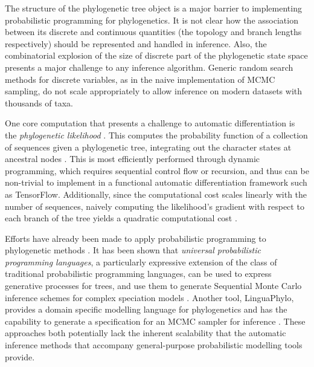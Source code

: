 The structure of the phylogenetic tree object is a major barrier to implementing probabilistic programming for phylogenetics. It is not clear how the association between its discrete and continuous quantities (the topology and branch lengths respectively) should be represented and handled in inference. Also, the combinatorial explosion of the size of discrete part of the phylogenetic state space presents a major challenge to any inference algorithm. Generic random search methods for discrete variables, as in the naive implementation of MCMC sampling, do not scale appropriately to allow inference on modern datasets with thousands of taxa.

One core computation that presents a challenge to automatic differentiation is the \textit{phylogenetic likelihood} \cite{felsenstein1981evolutionary}. This computes the probability function of a collection of sequences given a phylogenetic tree, integrating out the character states at ancestral nodes . This is most efficiently performed through dynamic programming, which requires sequential control flow or recursion, and thus can be non-trivial to implement in a functional automatic differentiation framework such as TensorFlow. Additionally, since the computational cost scales linearly with the number of sequences, naively computing the likelihood's gradient with respect to each branch of the tree yields a quadratic computational cost \cite{ji2020gradients}.

Efforts have already been made to apply probabilistic programming to phylogenetic methods
\cite{fourment2019evaluating, ronquist2021universal, drummond2022linguaphylo}. It has been shown that \textit{universal probabilistic programming languages}, a particularly expressive extension of the class of traditional probabilistic programming languages, can be used to express generative processes for trees, and use them to generate Sequential Monte Carlo inference schemes for complex speciation models \cite{ronquist2021universal}. Another tool, LinguaPhylo, provides a domain specific modelling language for phylogenetics and has the capability to generate a specification for an MCMC sampler for inference \cite{drummond2022linguaphylo}. These approaches both potentially lack the inherent scalability that the automatic inference methods that accompany general-purpose probabilistic modelling tools provide.

